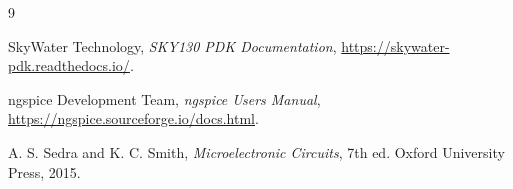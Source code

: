 \begin{thebibliography}{9}

SkyWater Technology, \emph{SKY130 PDK Documentation}, \url{https://skywater-pdk.readthedocs.io/}.

ngspice Development Team, \emph{ngspice Users Manual}, \url{https://ngspice.sourceforge.io/docs.html}.

A. S. Sedra and K. C. Smith, \emph{Microelectronic Circuits}, 7th ed. Oxford University Press, 2015.

\end{thebibliography}

